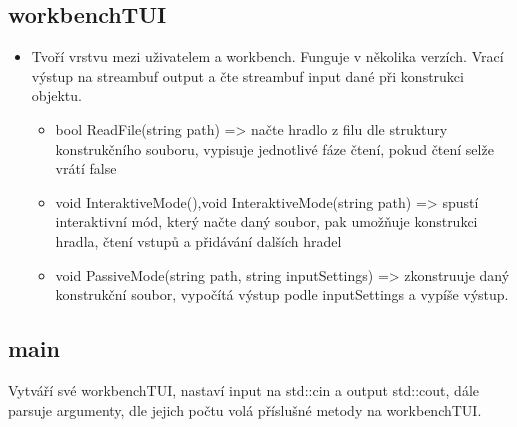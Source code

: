 \documentclass[12pt, oneside]{article}
\begin{document}
\subsection*{workbenchTUI} 
\begin{itemize} 
\item Tvoří vrstvu mezi uživatelem a workbench. Funguje v několika verzích. Vrací výstup na streambuf output a čte streambuf input  dané při konstrukci objektu.
\begin{itemize} 
\item bool ReadFile(string path) => načte hradlo z filu dle struktury konstrukčního souboru, vypisuje jednotlivé fáze čtení, pokud čtení selže vrátí false 
\item void InteraktiveMode(),void InteraktiveMode(string path) => spustí interaktivní mód, který načte daný soubor, pak umožňuje konstrukci hradla, čtení vstupů a přidávání dalších hradel 
\item 	void PassiveMode(string path, string inputSettings) => zkonstruuje daný konstrukční soubor, vypočítá výstup podle inputSettings a vypíše výstup. 
\end{itemize}
\end{itemize} 
\subsection*{main}
Vytváří své workbenchTUI, nastaví input na std::cin a output std::cout, dále parsuje argumenty, dle jejich počtu volá příslušné metody na workbenchTUI.
\end{document}
